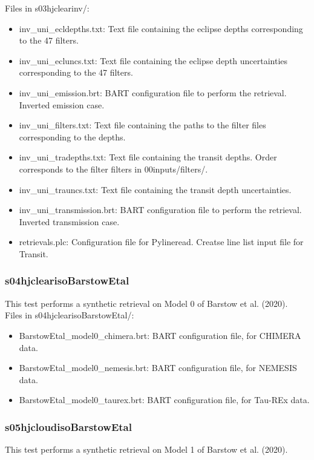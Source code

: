\documentclass[letterpaper, 12pt]{article}
\begin{document}
Files in s03hjclearinv/:
\begin{itemize} \itemsep0pt
  \item inv{\_}uni{\_}ecldepths.txt: Text file containing the eclipse depths 
        corresponding to the 47 filters.
  \item inv{\_}uni{\_}ecluncs.txt: Text file containing the eclipse depth 
        uncertainties corresponding to the 47 filters.
  \item inv{\_}uni{\_}emission.brt: BART configuration file to perform the retrieval. 
        Inverted emission case.
  \item inv{\_}uni{\_}filters.txt: Text file containing the paths to the filter files corresponding to the depths.
  \item inv{\_}uni{\_}tradepths.txt: Text file containing the transit depths. Order 
        corresponds to the filter filters in 00inputs/filters/.
  \item inv{\_}uni{\_}trauncs.txt: Text file containing the transit depth 
        uncertainties. 
  \item inv{\_}uni{\_}transmission.brt: BART configuration file to perform the 
        retrieval. Inverted transmission case.
  \item retrievals.plc: Configuration file for Pylineread. Creatse line list input file for Transit.
\end{itemize}

\subsubsection{s04hjclearisoBarstowEtal}
This test performs a synthetic retrieval on Model 0 of Barstow et al. (2020).\\

Files in s04hjclearisoBarstowEtal/:
\begin{itemize} \itemsep0pt
  \item BarstowEtal{\_}model0{\_}chimera.brt: BART configuration file, for CHIMERA data.
  \item BarstowEtal{\_}model0{\_}nemesis.brt: BART configuration file, for NEMESIS data.
  \item BarstowEtal{\_}model0{\_}taurex.brt:  BART configuration file, for Tau-REx data.
\end{itemize}

\subsubsection{s05hjcloudisoBarstowEtal}
This test performs a synthetic retrieval on Model 1 of Barstow et al. (2020).\\
\end{document}
